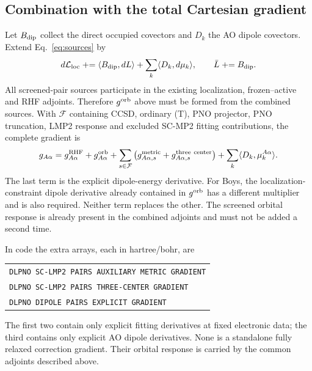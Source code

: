\documentclass[11pt]{article}
\newcommand{\ip}[2]{\langle #1,#2\rangle}
\begin{document}
\subsection{Combination with the total Cartesian gradient}
Let $B_{\rm dip}$ collect the direct occupied covectors and $D_k$ the AO
dipole covectors. Extend Eq.~\eqref{eq:sources} by
\begin{equation}
 d\mathcal L_{\rm loc}\mathrel{+}=\ip{B_{\rm dip}}{dL}
                    +\sum_k\ip{D_k}{d\mu_k},\qquad
 \bar L\mathrel{+}=B_{\rm dip}.
 \label{eq:gradient-screened-assembly-source}
\end{equation}
All screened-pair sources participate in the existing localization,
frozen--active and RHF adjoints. Therefore $g^{\rm orb}$ above must be
formed from the combined sources. With $\mathcal F$ containing CCSD,
ordinary (T), PNO projector, PNO truncation, LMP2 response and excluded
SC-MP2 fitting contributions, the complete gradient is
\begin{equation}
 g_{A\alpha}=g_{A\alpha}^{\rm RHF}+g_{A\alpha}^{\rm orb}
 +\sum_{s\in\mathcal F}\left(g_{A\alpha,s}^{\rm metric}
                         +g_{A\alpha,s}^{\rm three\ center}\right)
 +\sum_k\ip{D_k}{\mu_k^{A\alpha}}.
 \label{eq:gradient-screened-total}
\end{equation}
The last term is the explicit dipole-energy derivative. For Boys, the
localization-constraint dipole derivative already contained in
$g^{\rm orb}$ has a different multiplier and is also required. Neither
term replaces the other. The screened orbital response is already present
in the combined adjoints and must not be added a second time.

In code the extra arrays, each in hartree/bohr, are
\begin{center}
\begin{tabular}{l}
\texttt{DLPNO SC-LMP2 PAIRS AUXILIARY METRIC GRADIENT}\\
\texttt{DLPNO SC-LMP2 PAIRS THREE-CENTER GRADIENT}\\
\texttt{DLPNO DIPOLE PAIRS EXPLICIT GRADIENT}
\end{tabular}
\end{center}
The first two contain only explicit fitting derivatives at fixed electronic
data; the third contains only explicit AO dipole derivatives. None is a
standalone fully relaxed correction gradient. Their orbital response is
carried by the common adjoints described above.
\end{document}
